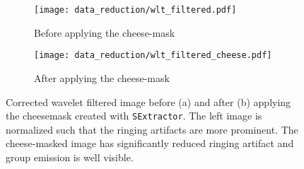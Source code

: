 \begin{figure}[htbp]
    \centering
    \begin{subfigure}[b]{0.48\textwidth}
        \centering
        \texttt{[image: data\_reduction/wlt\_filtered.pdf]}
        \caption{Before applying the cheese-mask}
        \label{fig:wlt_filtered}
    \end{subfigure}
    \hfill
    \begin{subfigure}[b]{0.48\textwidth}
        \centering
        \texttt{[image: data\_reduction/wlt\_filtered\_cheese.pdf]}
        \caption{After applying the cheese-mask}
        \label{fig:wvl_filtered_cheesed}
    \end{subfigure}
    \caption{Corrected wavelet filtered image before (a) and after (b) applying the cheesemask created with \texttt{SExtractor}. The left image is normalized such that the ringing artifacts are more prominent. The cheese-masked image has significantly reduced ringing artifact and group emission is well visible.}
    \label{fig:comparison_wvl_filtered}
\end{figure}




